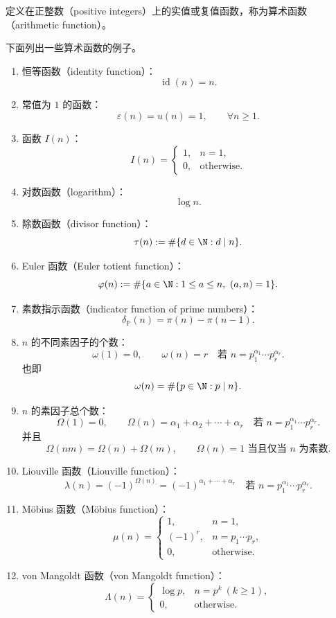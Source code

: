 \begin{definition}[算术函数]
	定义在正整数（positive integers）上的实值或复值函数，称为算术函数（arithmetic function）。
\end{definition}

下面列出一些算术函数的例子。

\begin{enumerate}
	\item 恒等函数（identity function）：
	\[
		\operatorname{id}(n)=n.
	\]
	\item 常值为 $1$ 的函数：
	\[
		\varepsilon(n)=u(n)=1,\qquad \forall n\geq 1.
	\]

	\item 函数 $I(n)$：
	\[
		I(n)=
		\begin{cases}
			1, & n=1,\\
			0, & \text{otherwise}.
		\end{cases}
	\]
	\item 对数函数（logarithm）：
	\[
		\log n.
	\]
	\item 除数函数（divisor function）：
	\[
		\tau(n):=\#\{d\in\N : d\mid n\}.
	\]
	\item Euler 函数（Euler totient function）：
	\[
		\varphi(n):=\#\{a\in\N:1\leq a\leq n,\ (a,n)=1\}.
	\]
	\item 素数指示函数（indicator function of prime numbers）：
	\[
		\delta_{\mathbb P}(n)=\pi(n)-\pi(n-1).
	\]
	\item $n$ 的不同素因子的个数：
	\[
		\omega(1)=0,\qquad
		\omega(n)=r \quad \text{若 } n=p_1^{\alpha_1}\cdots p_r^{\alpha_r}.
	\]
	也即
	\[
		\omega(n)=\#\{p\in\N:p\mid n\}.
	\]
	\item $n$ 的素因子总个数：
	\[
		\Omega(1)=0,\qquad
		\Omega(n)=\alpha_1+\alpha_2+\cdots+\alpha_r
		\quad \text{若 } n=p_1^{\alpha_1}\cdots p_r^{\alpha_r}.
	\]
	并且
	\[
		\Omega(nm)=\Omega(n)+\Omega(m),\qquad \Omega(n)=1 \text{ 当且仅当 } n \text{ 为素数}.
	\]
	\item Liouville 函数（Liouville function）：
	\[
		\lambda(n)=(-1)^{\Omega(n)}
		=(-1)^{\alpha_1+\cdots+\alpha_r}
		\quad \text{若 } n=p_1^{\alpha_1}\cdots p_r^{\alpha_r}.
	\]
	\item Möbius 函数（Möbius function）：
	\[
		\mu(n)=
		\begin{cases}
			1, & n=1,\\
			(-1)^r, & n=p_1\cdots p_r,\\
			0, & \text{otherwise}.
		\end{cases}
	\]
	\item von Mangoldt 函数（von Mangoldt function）：
	\[
		\Lambda(n)=
		\begin{cases}
			\log p, & n=p^k\ (k\geq 1),\\
			0, & \text{otherwise}.
		\end{cases}
	\]
\end{enumerate}

